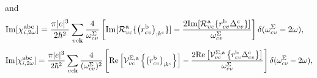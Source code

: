  and
\begin{align}\label{imchi2wf}
\mathrm{Im}[\chi_{i,2\omega}^{\mathrm{a}\mathrm{b}\mathrm{c}}]
&=
\frac{\pi|e|^3}{2\hbar^2}\sum_{vc\mathbf{k}}
\frac{4}{\omega^\Sigma_{cv}}
\left[
\mathrm{Im}[{\cal R}^{\mathrm{a}}_{vc}\{\left(r^{\mathrm{b}}_{cv}\right)_{;k^{\mathrm{c}}}\}]
-
\frac{2\mathrm{Im}[{\cal R}^{\mathrm{a}}_{vc}\{r^{\mathrm{b}}_{cv}\Delta^{\mathrm{c}}_{cv}\}]}{\omega^\Sigma_{cv}}
\right]\delta(\omega^\Sigma_{cv}-2\omega)
,
\end{align}
\begin{equation}\label{c-calvimchi2wn}
\mathrm{Im}[\chi_{i,2\omega}^{\mathrm{a}\mathrm{b}\mathrm{c}}] 
=
 \frac{\pi \vert
   e\vert^{3}}{2\hbar^2}\sum_{vc\mathbf{k}}\frac{4}{(\omega^\Sigma_{cv})^{2}}
\left[\mathrm{Re}\left[\mathcal{V}^{\Sigma,\text{a}}_{vc}\left\{\left(r^{\text{b}}_{cv}\right)_{;k^{\text{c}}}
\right\}\right] -
\frac{2\mathrm{Re}\left[\mathcal{V}^{\Sigma,\text{a}}_{vc}\left\{r^{\text{b}}_{cv}
\Delta^{\text{c}}_{cv}\right\}\right]}{\omega^\Sigma_{cv}}\right]\delta(\omega^\Sigma_{cv}-2\omega)
,
\end{equation}

